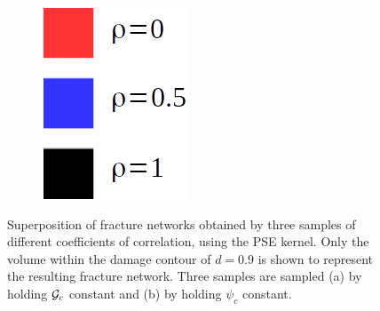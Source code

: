 \begin{figure}[!htbp]
\begin{subfigure}[b]{0.4\textwidth}
    \caption{}
    \label{fig: Chapter4/2D/morphology_Gc_constant}
  \end{subfigure}
  \begin{subfigure}[b]{0.1\textwidth}
    \includegraphics[width=\textwidth]{Chapter4/figures/rho.png}
    \caption*{}
    \vspace{0.75in}
  \end{subfigure}
  \caption[Superposition of fracture networks obtained by three samples of different coefficients of correlation, using the PSE kernel.]{ Superposition of fracture networks obtained by three samples of different coefficients of correlation, using the PSE kernel. Only the volume within the damage contour of $d = 0.9$ is shown to represent the resulting fracture network. Three samples are sampled (a) by holding ${\mathcal{G}_c}$ constant and (b) by holding $\psi_c$ constant. }
  \label{fig: Chapter4/2D/compare_morphology}
\end{figure}

